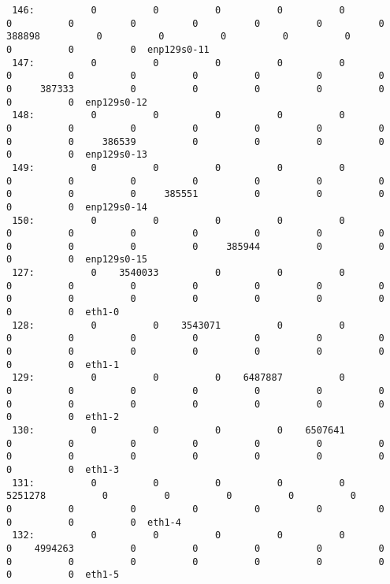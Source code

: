 \begin{lstlisting}
 146:          0          0          0          0          0          0          0          0          0          0          0          0     388898          0          0          0          0          0          0          0          0  enp129s0-11
 147:          0          0          0          0          0          0          0          0          0          0          0          0          0     387333          0          0          0          0          0          0          0  enp129s0-12
 148:          0          0          0          0          0          0          0          0          0          0          0          0          0          0     386539          0          0          0          0          0          0  enp129s0-13
 149:          0          0          0          0          0          0          0          0          0          0          0          0          0          0          0     385551          0          0          0          0          0  enp129s0-14
 150:          0          0          0          0          0          0          0          0          0          0          0          0          0          0          0          0     385944          0          0          0          0  enp129s0-15
 127:          0    3540033          0          0          0          0          0          0          0          0          0          0          0          0          0          0          0          0          0          0          0  eth1-0
 128:          0          0    3543071          0          0          0          0          0          0          0          0          0          0          0          0          0          0          0          0          0          0  eth1-1
 129:          0          0          0    6487887          0          0          0          0          0          0          0          0          0          0          0          0          0          0          0          0          0  eth1-2
 130:          0          0          0          0    6507641          0          0          0          0          0          0          0          0          0          0          0          0          0          0          0          0  eth1-3
 131:          0          0          0          0          0    5251278          0          0          0          0          0          0          0          0          0          0          0          0          0          0          0  eth1-4
 132:          0          0          0          0          0          0    4994263          0          0          0          0          0          0          0          0          0          0          0          0          0          0  eth1-5

\end{lstlisting}
